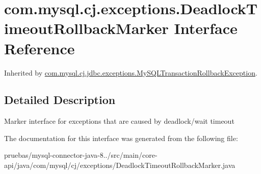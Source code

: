 \hypertarget{interfacecom_1_1mysql_1_1cj_1_1exceptions_1_1_deadlock_timeout_rollback_marker}{}\section{com.\+mysql.\+cj.\+exceptions.\+Deadlock\+Timeout\+Rollback\+Marker Interface Reference}
\label{interfacecom_1_1mysql_1_1cj_1_1exceptions_1_1_deadlock_timeout_rollback_marker}


Inherited by \mbox{\hyperlink{classcom_1_1mysql_1_1cj_1_1jdbc_1_1exceptions_1_1_my_s_q_l_transaction_rollback_exception}{com.\+mysql.\+cj.\+jdbc.\+exceptions.\+My\+S\+Q\+L\+Transaction\+Rollback\+Exception}}.



\subsection{Detailed Description}
Marker interface for exceptions that are caused by deadlock/wait timeout 

The documentation for this interface was generated from the following file\+:\begin{DoxyCompactItemize}
\item 
pruebas/mysql-\/connector-\/java-\/8../src/main/core-\/api/java/com/mysql/cj/exceptions/Deadlock\+Timeout\+Rollback\+Marker.\+java\end{DoxyCompactItemize}
